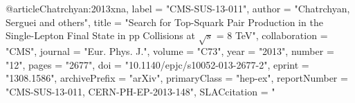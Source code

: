 @article{Chatrchyan:2013xna,
      label          = "CMS-SUS-13-011",
      author         = "Chatrchyan, Serguei and others",
      title          = "{Search for Top-Squark Pair Production in the
                        Single-Lepton Final State in pp Collisions at $\sqrt{s}$ =
                        8 TeV}",
      collaboration  = "CMS",
      journal        = "Eur. Phys. J.",
      volume         = "C73",
      year           = "2013",
      number         = "12",
      pages          = "2677",
      doi            = "10.1140/epjc/s10052-013-2677-2",
      eprint         = "1308.1586",
      archivePrefix  = "arXiv",
      primaryClass   = "hep-ex",
      reportNumber   = "CMS-SUS-13-011, CERN-PH-EP-2013-148",
      SLACcitation   = "%
}

